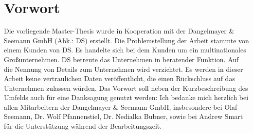 \chapter*{Vorwort}
Die vorliegende Master-Thesis wurde in Kooperation mit der Dangelmayer \& Seemann GmbH (Abk.: DS) erstellt. Die Problemstellung der Arbeit stammte von einem Kunden von DS. Es handelte sich bei dem Kunden um ein multinationales Großunternehmen. DS betreute das Unternehmen in beratender Funktion. Auf die Nennung von Details zum Unternehmen wird verzichtet. Es werden in dieser Arbeit keine vertraulichen Daten veröffentlicht, die einen Rückschluss auf das Unternehmen zulassen würden. Das Vorwort soll neben der Kurzbeschreibung des Umfelds auch für eine Danksagung genutzt werden: Ich bedanke mich herzlich bei allen Mitarbeitern der Dangelmayer \& Seemann GmbH, insbesondere bei Olaf Seemann, Dr. Wolf Pfannenstiel, Dr. Nedialka Bubner, sowie bei Andrew Smart für die Unterstützung während der Bearbeitungszeit. 